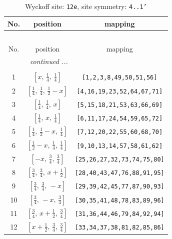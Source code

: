 \documentclass[fleqn,8pt]{jsarticle}
\begin{document}
\begin{longtable}{ccc}
\caption{Wyckoff site: {\tt 12e}, site symmetry: {\tt 4..1'}}
 \\
 \hline \hline
No. & position & mapping \\ \hline \endfirsthead

\multicolumn{2}{l}{\tablename\ \thetable{}} \\
 \hline \hline
No. & position & mapping \\ \hline \endhead

 \hline \hline
\multicolumn{2}{r}{\footnotesize\it continued ...} \\ \endfoot

 \hline \hline
\multicolumn{2}{r}{} \\ \endlastfoot

1 & $\left[ x,\, \frac{1}{4},\, \frac{1}{4} \right]$ & {\tt [1,2,3,8,49,50,51,56]} \\ \hline
2 & $\left[ \frac{1}{4},\, \frac{1}{4},\, \frac{1}{2} - x \right]$ & {\tt [4,16,19,23,52,64,67,71]} \\ \hline
3 & $\left[ \frac{1}{4},\, \frac{1}{4},\, x \right]$ & {\tt [5,15,18,21,53,63,66,69]} \\ \hline
4 & $\left[ \frac{1}{4},\, x,\, \frac{1}{4} \right]$ & {\tt [6,11,17,24,54,59,65,72]} \\ \hline
5 & $\left[ \frac{1}{4},\, \frac{1}{2} - x,\, \frac{1}{4} \right]$ & {\tt [7,12,20,22,55,60,68,70]} \\ \hline
6 & $\left[ \frac{1}{2} - x,\, \frac{1}{4},\, \frac{1}{4} \right]$ & {\tt [9,10,13,14,57,58,61,62]} \\ \hline
7 & $\left[ - x,\, \frac{3}{4},\, \frac{3}{4} \right]$ & {\tt [25,26,27,32,73,74,75,80]} \\ \hline
8 & $\left[ \frac{3}{4},\, \frac{3}{4},\, x + \frac{1}{2} \right]$ & {\tt [28,40,43,47,76,88,91,95]} \\ \hline
9 & $\left[ \frac{3}{4},\, \frac{3}{4},\, - x \right]$ & {\tt [29,39,42,45,77,87,90,93]} \\ \hline
10 & $\left[ \frac{3}{4},\, - x,\, \frac{3}{4} \right]$ & {\tt [30,35,41,48,78,83,89,96]} \\ \hline
11 & $\left[ \frac{3}{4},\, x + \frac{1}{2},\, \frac{3}{4} \right]$ & {\tt [31,36,44,46,79,84,92,94]} \\ \hline
12 & $\left[ x + \frac{1}{2},\, \frac{3}{4},\, \frac{3}{4} \right]$ & {\tt [33,34,37,38,81,82,85,86]} \\
\end{longtable}
\end{document}
